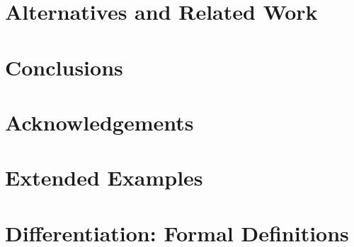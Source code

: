 \documentclass[10pt]{article}
\begin{document}
\section{Alternatives and Related Work}


\section{Conclusions}


\section*{Acknowledgements}





\appendix

\section{Extended Examples}
\label{sec:examples_long}


\section{Differentiation: Formal Definitions}
\label{sec:calculus_formal}



\end{document}
